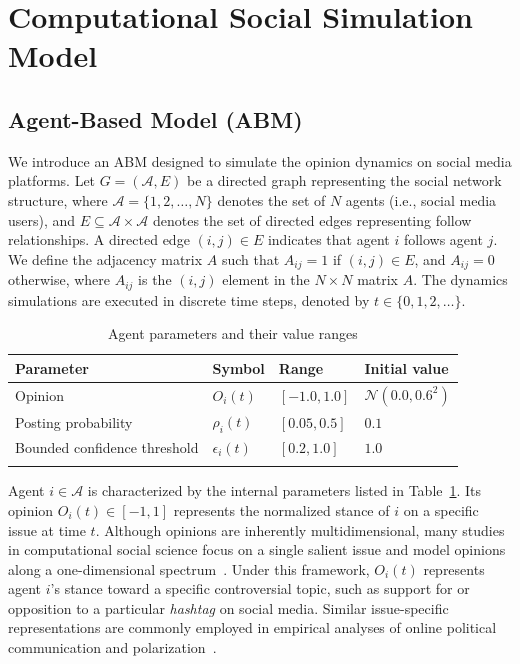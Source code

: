 \documentclass[pdflatex,sn-mathphys-num]{sn-jnl}%
\theoremstyle{thmstyleone}%
\theoremstyle{thmstyletwo}%
\theoremstyle{thmstylethree}%
\def\AgentSet{\mathcal{A}}
\def\post{\rho} %
\def\BoundedConfidence{\epsilon}
\begin{document}
\section{Computational Social Simulation Model}\label{model}
\subsection{Agent-Based Model (ABM)}
We introduce an ABM designed to simulate the opinion
dynamics on social media platforms. Let $G = (\AgentSet, E)$ be a
directed graph representing the social network structure, where
$\AgentSet = \{1, 2, \dots, N\}$ denotes the set of $N$ agents (i.e.,
social media users), and $E \subseteq \AgentSet \times \AgentSet$ denotes the
set of directed edges representing follow relationships. A directed
edge $(i, j) \in E$ indicates that agent $i$ follows agent $j$. We
define the adjacency matrix $A$ such that $A_{ij} = 1$ if $(i,j)\in
E$, and $A_{ij} = 0$ otherwise, where $A_{ij}$ is the $(i,j)$ element
in the $N\times N$ matrix $A$. The dynamics simulations are executed in discrete
time steps, denoted by $t \in \{0, 1, 2, \dots\}$.
\par

\begin{table}[t]
  \tabcolsep=5pt
  \centering
  \caption{Agent parameters and their value ranges}\label{agentParam}
  \begin{tabular}{llll}
    \toprule
    Parameter & Symbol & Range & Initial value \\
    \midrule
    Opinion & $O_i(t)$ & $[-1.0, 1.0]$ & $\mathcal{N}(0.0, 0.6^2)$ \\
    Posting probability & $\post_i(t)$ & $[0.05, 0.5]$ & $0.1$ \\
    Bounded confidence threshold & $\BoundedConfidence_i(t)$ & $[0.2, 1.0]$ & $1.0$\\
    \bottomrule\\
  \end{tabular}
\end{table}

Agent $i \in \AgentSet$ is characterized by the internal parameters listed in Table~\ref{agentParam}.
Its opinion $O_i(t) \in [-1, 1]$ represents the normalized
stance of $i$ on a specific issue at time $t$.
Although opinions are inherently multidimensional,
many studies in computational social science focus on a
single salient issue and model opinions along a one-dimensional
spectrum~\cite{Sasahara2021,Uthsav2020}. Under this framework, $O_i(t)$
represents agent $i$'s stance toward a specific
controversial topic, such as support for or
opposition to a particular \emph{hashtag} on social media.
Similar issue-specific representations are
commonly employed in empirical analyses of online
political communication and polarization~\cite{Conover2011,Toriumi2024}.
\end{document}
